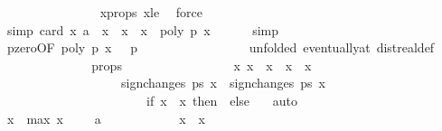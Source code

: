 \begin{isabellebody}
\ \ \ \ \ \ \ \ \ \ \ \ \ \ \isamarkupfalse%
\ x{\isacharunderscore}props\ x{\isacharunderscore}le\ \isamarkupfalse%
\ force\isanewline
\ \ \ \ \ \ \ \ \ \ \isamarkupfalse%
\ {\isacharbrackleft}simp{\isacharbrackright}{\isacharcolon}\ {\isachardoublequoteopen}card\ {\isacharbraceleft}x{\isacharprime}{\isachardot}\ a\ {\isacharless}\ x{\isacharprime}\ {\isasymand}\ x{\isacharprime}\ {\isasymle}\ x\ {\isasymand}\ poly\ p\ x{\isacharprime}\ {\isacharequal}\ {}{\isacharbraceright}\ {\isacharequal}\ {}{\isachardoublequoteclose}\ \isamarkupfalse%
\ simp\isanewline
\isanewline
\ \ \ \ \ \ \ \ \ \ \isamarkupfalse%
\ p{\isacharunderscore}zero{\isacharbrackleft}OF\ {\isacharbackquoteopen}poly\ p\ x\ {\isacharequal}\ {}{\isacharbackquoteclose}\ {\isacharbackquoteopen}p\ {\isasymnoteq}\ {}{\isacharbackquoteclose}{\isacharcomma}\ \isanewline
\ \ \ \ \ \ \ \ \ \ \ \ \ \ unfolded\ eventually{\isacharunderscore}at\ dist{\isacharunderscore}real{\isacharunderscore}def{\isacharbrackright}\ \isamarkupfalse%
\ {\isasymepsilon}\ \isacommand{{\isachardot}{\isachardot}}\isamarkupfalse%
\isanewline
\ \ \ \ \ \ \ \ \ \ \isamarkupfalse%
\ {\isasymepsilon}{\isacharunderscore}props{\isacharcolon}\ {\isachardoublequoteopen}{\isasymepsilon}\ {\isachargreater}\ {}{\isachardoublequoteclose}\isanewline
\ \ \ \ \ \ \ \ \ \ \ \ \ \ {\isachardoublequoteopen}{\isasymforall}x{\isacharprime}{\isachardot}\ x{\isacharprime}\ {\isasymnoteq}\ x\ {\isasymand}\ {\isasymbar}x{\isacharprime}\ {\isacharminus}\ x{\isasymbar}\ {\isacharless}\ {\isasymepsilon}\ {\isasymlongrightarrow}\ \isanewline
\ \ \ \ \ \ \ \ \ \ \ \ \ \ \ \ \ \ \ sign{\isacharunderscore}changes\ ps\ x{\isacharprime}\ {\isacharequal}\ sign{\isacharunderscore}changes\ ps\ x\ {\isacharplus}\ \isanewline
\ \ \ \ \ \ \ \ \ \ \ \ \ \ \ \ \ \ \ \ \ \ \ {\isacharparenleft}if\ x{\isacharprime}\ {\isacharless}\ x\ then\ {}\ else\ {}{\isacharparenright}{\isachardoublequoteclose}\ \isamarkupfalse%
\ auto\isanewline
\ \ \ \ \ \ \ \ \ \ \isamarkupfalse%
\ x{\isacharprime}\ {\isasymequiv}\ {\isachardoublequoteopen}max\ {\isacharparenleft}x\ {\isacharminus}\ {\isasymepsilon}\ {\isacharslash}\ {}{\isacharparenright}\ a{\isachardoublequoteclose}\isanewline
\ \ \ \ \ \ \ \ \ \ \isamarkupfalse%
\ {\isachardoublequoteopen}{\isasymbar}x{\isacharprime}\ {\isacharminus}\ x{\isasymbar}\ {\isacharless}\ {\isasymepsilon}{\isachardoublequoteclose}\ \isamarkupfalse%

\end{isabellebody}
